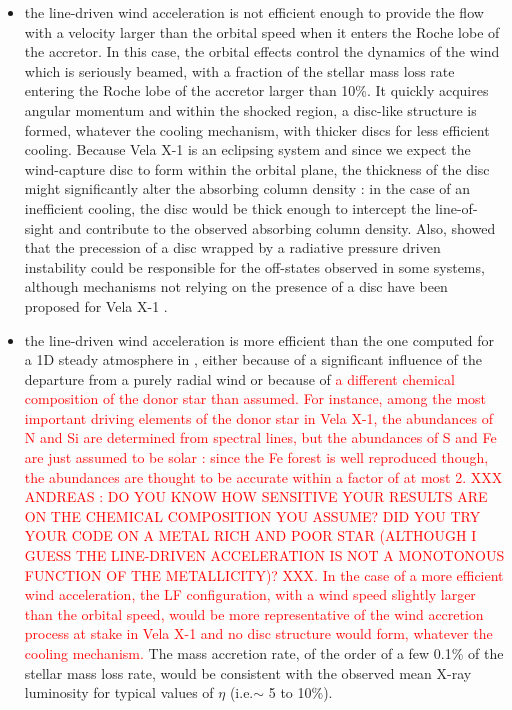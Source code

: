 \documentclass{aa}
\makeatletter
\newcommand*{\eg}{e.g.\@\xspace}
\newcommand*{\ie}{i.e.\@\xspace}
\makeatother
\begin{document}
\begin{itemize}
\item the line-driven wind acceleration is not efficient enough to provide the flow with a velocity larger than the orbital speed when it enters the Roche lobe of the accretor. In this case, the orbital effects control the dynamics of the wind which is seriously beamed, with a fraction of the stellar mass loss rate entering the Roche lobe of the accretor larger than 10\%. It quickly acquires angular momentum and within the shocked region, a disc-like structure is formed, whatever the cooling mechanism, with thicker discs for less efficient cooling. Because Vela X-1 is an eclipsing system and since we expect the wind-capture disc to form within the orbital plane, the thickness of the disc might significantly alter the absorbing column density : in the case of an inefficient cooling, the disc would be thick enough to intercept the line-of-sight and contribute to the observed absorbing column density. Also, \cite{Foulkes:2010wa} showed that the precession of a disc wrapped by a radiative pressure driven instability \citep{Petterson1977a,Petterson1977} could be responsible for the off-states observed in some systems, although mechanisms not relying on the presence of a disc have been proposed for Vela X-1 \citep[see \eg][]{Manousakis2015c}.
\item the line-driven wind acceleration is more efficient than the one computed for a 1D steady atmosphere in \cite{Sander2017}, either because of a significant influence of the departure from a purely radial wind or because of \textcolor{red}{a different chemical composition of the donor star than assumed. For instance, among the most important driving elements of the donor star in Vela X-1, the abundances of N and Si are determined from spectral lines, but the abundances of S and Fe are just assumed to be solar \citep{Gimenez-Garcia2016} : since the Fe forest is well reproduced though, the abundances are thought to be accurate within a factor of at most 2.
 XXX ANDREAS : DO YOU KNOW HOW SENSITIVE YOUR RESULTS ARE ON THE CHEMICAL COMPOSITION YOU ASSUME? DID YOU TRY YOUR CODE ON A METAL RICH AND POOR STAR (ALTHOUGH I GUESS THE LINE-DRIVEN ACCELERATION IS NOT A MONOTONOUS FUNCTION OF THE METALLICITY)? XXX. In the case of a more efficient wind acceleration, the LF configuration, with a wind speed slightly larger than the orbital speed, would be more representative of the wind accretion process at stake in Vela X-1 and no disc structure would form, whatever the cooling mechanism.} The mass accretion rate, of the order of a few 0.1\% of the stellar mass loss rate, would be consistent with the observed mean X-ray luminosity for typical values of $\eta$ (\ie $\sim$ 5 to 10\%).
\end{itemize}
\end{document}
